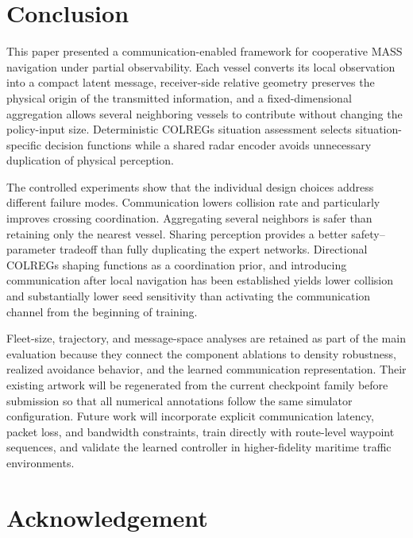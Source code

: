 \documentclass[final,5p,times,twocolumn]{elsarticle}
\begin{document}
\section{Conclusion}
{\color{red}
This paper presented a communication-enabled framework for cooperative MASS navigation under partial observability. Each vessel converts its local observation into a compact latent message, receiver-side relative geometry preserves the physical origin of the transmitted information, and a fixed-dimensional aggregation allows several neighboring vessels to contribute without changing the policy-input size. Deterministic COLREGs situation assessment selects situation-specific decision functions while a shared radar encoder avoids unnecessary duplication of physical perception.

The controlled experiments show that the individual design choices address different failure modes. Communication lowers collision rate and particularly improves crossing coordination. Aggregating several neighbors is safer than retaining only the nearest vessel. Sharing perception provides a better safety--parameter tradeoff than fully duplicating the expert networks. Directional COLREGs shaping functions as a coordination prior, and introducing communication after local navigation has been established yields lower collision and substantially lower seed sensitivity than activating the communication channel from the beginning of training.

Fleet-size, trajectory, and message-space analyses are retained as part of the main evaluation because they connect the component ablations to density robustness, realized avoidance behavior, and the learned communication representation. Their existing artwork will be regenerated from the current checkpoint family before submission so that all numerical annotations follow the same simulator configuration. Future work will incorporate explicit communication latency, packet loss, and bandwidth constraints, train directly with route-level waypoint sequences, and validate the learned controller in higher-fidelity maritime traffic environments.
}

\section*{Acknowledgement}
\end{document}
